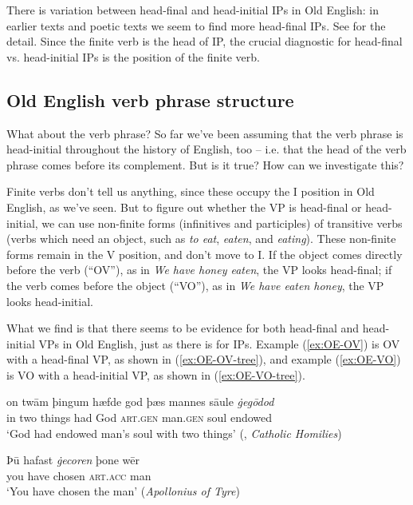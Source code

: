 \noindent There is variation between head-final and head-initial IPs in Old English: in earlier texts and poetic texts we seem to find more head-final IPs. See \citet[§8.2.3]{RingeTaylor2014} for the detail. Since the finite verb is the head of IP, the crucial diagnostic for head-final vs. head-initial IPs is the position of the finite verb.

\subsection{Old English verb phrase structure}\label{OE-OV}

What about the verb phrase? So far we've been assuming that the verb phrase is head-initial throughout the history of English, too -- i.e. that the head of the verb phrase comes before its complement. But is it true? How can we investigate this?

Finite verbs don't tell us anything, since these occupy the I position in Old English, as we've seen. But to figure out whether the VP is head-final or head-initial, we can use non-finite forms (infinitives and participles) of transitive verbs (verbs which need an object, such as \textit{to eat}, \textit{eaten}, and \textit{eating}). These non-finite forms remain in the V position, and don't move to I. If the object comes directly before the verb (``OV''), as in \emph{We have honey eaten}, the VP looks head-final; if the verb comes before the object (``VO''), as in \emph{We have eaten honey}, the VP looks head-initial.

What we find is that there seems to be evidence for both head-final and head-initial VPs in Old English, just as there is for IPs. Example (\ref{ex:OE-OV}) is OV with a head-final VP, as shown in (\ref{ex:OE-OV-tree}), and example (\ref{ex:OE-VO}) is VO with a head-initial VP, as shown in (\ref{ex:OE-VO-tree}).

\begin{exe}
    \ex\label{ex:OE-OV}
    \gll on twām þingum hæfde god þæs mannes sāule \emph{ġegōdod}\\
    in two things had God \textsc{art.gen} man.\textsc{gen} soul endowed\\
    \trans `God had endowed man's soul with two things' \hfill (, \emph{Catholic Homilies})
    
    \ex\label{ex:OE-VO}
    \gll Þū hafast \emph{ġecoren} þone wēr\\
    you have chosen \textsc{art.acc} man\\
    \trans `You have chosen the man' \hfill (\emph{Apollonius of Tyre})
\end{exe}

